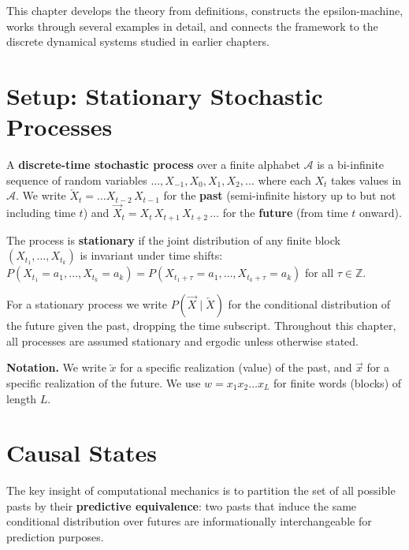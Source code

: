 This chapter develops the theory from definitions, constructs the epsilon-machine, works through several examples in detail, and connects the framework to the discrete dynamical systems studied in earlier chapters.



\section{Setup: Stationary Stochastic Processes}

\begin{definition}
A \textbf{discrete-time stochastic process} over a finite alphabet $\mathcal{A}$ is a bi-infinite sequence of random variables $\ldots, X_{-1}, X_0, X_1, X_2, \ldots$ where each $X_t$ takes values in $\mathcal{A}$. We write $\overleftarrow{X}_t = \ldots X_{t-2}\, X_{t-1}$ for the \textbf{past} (semi-infinite history up to but not including time $t$) and $\overrightarrow{X}_t = X_t\, X_{t+1}\, X_{t+2}\, \ldots$ for the \textbf{future} (from time $t$ onward).
\end{definition}

\begin{definition}[Stationarity]
The process is \textbf{stationary} if the joint distribution of any finite block $(X_{t_1}, \ldots, X_{t_k})$ is invariant under time shifts: $P(X_{t_1} = a_1, \ldots, X_{t_k} = a_k) = P(X_{t_1+\tau} = a_1, \ldots, X_{t_k+\tau} = a_k)$ for all $\tau \in \mathbb{Z}$.

For a stationary process we write $P(\overrightarrow{X} \mid \overleftarrow{X})$ for the conditional distribution of the future given the past, dropping the time subscript. Throughout this chapter, all processes are assumed stationary and ergodic unless otherwise stated.

\textbf{Notation.} We write $\overleftarrow{x}$ for a specific realization (value) of the past, and $\overrightarrow{x}$ for a specific realization of the future. We use $w = x_1 x_2 \ldots x_L$ for finite words (blocks) of length $L$.
\end{definition}



\section{Causal States}

The key insight of computational mechanics is to partition the set of all possible pasts by their \textbf{predictive equivalence}: two pasts that induce the same conditional distribution over futures are informationally interchangeable for prediction purposes.

